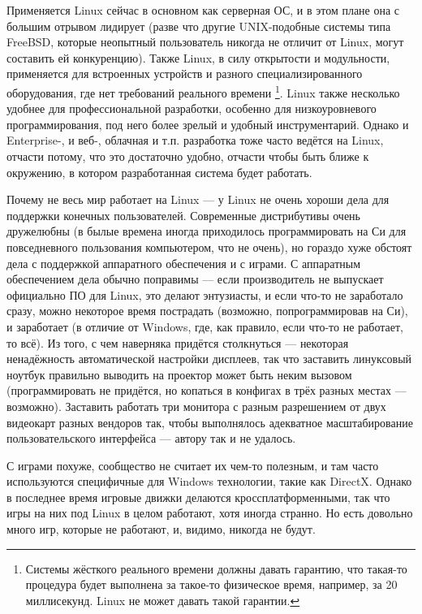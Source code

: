 \documentclass{../../text-style}
\begin{document}
Применяется Linux сейчас в основном как серверная ОС, и в этом плане она с большим отрывом лидирует (разве что другие UNIX-подобные системы типа FreeBSD, которые неопытный пользователь никогда не отличит от Linux, могут составить ей конкуренцию).
Также Linux, в силу открытости и модульности, применяется для встроенных устройств и разного специализированного оборудования, где нет требований реального времени%
\footnote{Системы жёсткого реального времени должны давать гарантию, что такая-то процедура будет выполнена за такое-то физическое время, например, за 20 миллисекунд. Linux не может давать такой гарантии.}.
Linux также несколько удобнее для профессиональной разработки, особенно для низкоуровневого программирования, под него более зрелый и удобный инструментарий.
Однако и Enterprise-, и веб-, облачная и т.п. разработка тоже часто ведётся на Linux, отчасти потому, что это достаточно удобно, отчасти чтобы быть ближе к окружению, в котором разработанная система будет работать.

Почему не весь мир работает на Linux --- у Linux не очень хороши дела для поддержки конечных пользователей.
Современные дистрибутивы очень дружелюбны (в былые времена иногда приходилось программировать на Си для повседневного пользования компьютером, что не очень), но гораздо хуже обстоят дела с поддержкой аппаратного обеспечения и с играми.
С аппаратным обеспечением дела обычно поправимы --- если производитель не выпускает официально ПО для Linux, это делают энтузиасты, и если что-то не заработало сразу, можно некоторое время пострадать (возможно, попрограммировав на Си), и заработает (в отличие от Windows, где, как правило, если что-то не работает, то всё).
Из того, с чем наверняка придётся столкнуться --- некоторая ненадёжность автоматической настройки дисплеев, так что заставить линуксовый ноутбук правильно выводить на проектор может быть неким вызовом (программировать не придётся, но копаться в конфигах в трёх разных местах --- возможно).
Заставить работать три монитора с разным разрешением от двух видеокарт разных вендоров так, чтобы выполнялось адекватное масштабирование пользовательского интерфейса --- автору так и не удалось.

С играми похуже, сообщество не считает их чем-то полезным, и там часто используются специфичные для Windows технологии, такие как DirectX.
Однако в последнее время игровые движки делаются кроссплатформенными, так что игры на них под Linux в целом работают, хотя иногда странно.
Но есть довольно много игр, которые не работают, и, видимо, никогда не будут.
\end{document}
